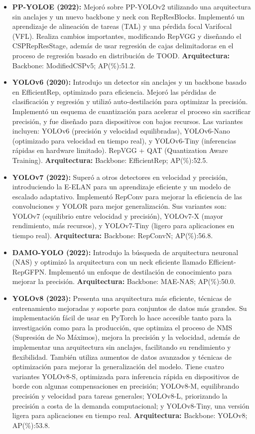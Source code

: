\begin{itemize}
    \item \textbf{PP-YOLOE (2022):} Mejoró sobre PP-YOLOv2 utilizando una arquitectura sin anclajes y un nuevo backbone y neck con RepResBlocks. Implementó un aprendizaje de alineación de tareas (TAL) y una pérdida focal Varifocal (VFL). Realiza cambios importantes, modificando RepVGG y diseñando el CSPRepResStage, además de usar regresión de cajas delimitadoras en el proceso de regresión basado en distribución de TOOD. 
    \textbf{Arquitectura:} Backbone: ModifiedCSPv5; AP(\%):51.2.

    \item \textbf{YOLOv6 (2020):}  Introdujo un detector sin anclajes y un backbone basado en EfficientRep, optimizado para eficiencia. Mejoró las pérdidas de clasificación y regresión y utilizó auto-destilación para optimizar la precisión. Implementó un esquema de cuantización para acelerar el proceso sin sacrificar precisión, y fue diseñado para dispositivos con bajos recursos. Las variantes incluyen: YOLOv6 (precisión y velocidad equilibradas), YOLOv6-Nano (optimizado para velocidad en tiempo real), y YOLOv6-Tiny (inferencias rápidas en hardware limitado). RepVGG + QAT (Quantization Aware Training).
    \textbf{Arquitectura:} Backbone: EfficientRep; AP(\%):52.5.

    \item \textbf{YOLOv7 (2022):} Superó a otros detectores en velocidad y precisión, introduciendo la E-ELAN para un aprendizaje eficiente y un modelo de escalado adaptativo. Implementó RepConv para mejorar la eficiencia de las convoluciones y YOLOR para mejor generalización. Sus variantes son: YOLOv7 (equilibrio entre velocidad y precisión), YOLOv7-X (mayor rendimiento, más recursos), y YOLOv7-Tiny (ligero para aplicaciones en tiempo real).
    \textbf{Arquitectura:} Backbone: RepConvN; AP(\%):56.8.
    
    \item \textbf{DAMO-YOLO (2022):} Introdujo la búsqueda de arquitectura neuronal (NAS) y optimizó la arquitectura con un neck eficiente llamado Efficient-RepGFPN. Implementó un enfoque de destilación de conocimiento para mejorar la precisión. 
    \textbf{Arquitectura:} Backbone:   MAE-NAS; AP(\%):50.0.
    
    \item \textbf{YOLOv8 (2023):}  Presenta una arquitectura más eficiente, técnicas de entrenamiento mejoradas y soporte para conjuntos de datos más grandes. Su implementación fácil de usar en PyTorch lo hace accesible tanto para la investigación como para la producción, que optimiza el proceso de NMS (Supresión de No Máximos), mejora la precisión y la velocidad, además de implementar una arquitectura sin anclajes, facilitando su rendimiento y flexibilidad. También utiliza aumentos de datos avanzados y técnicas de optimización para mejorar la generalización del modelo. Tiene cuatro variantes YOLOv8-S, optimizada para inferencia rápida en dispositivos de borde con algunas compensaciones en precisión; YOLOv8-M, equilibrando precisión y velocidad para tareas generales; YOLOv8-L, priorizando la precisión a costa de la demanda computacional; y YOLOv8-Tiny, una versión ligera para aplicaciones en tiempo real.
    \textbf{Arquitectura:} Backbone: YOLOv8; AP(\%):53.8.


\end{itemize}
